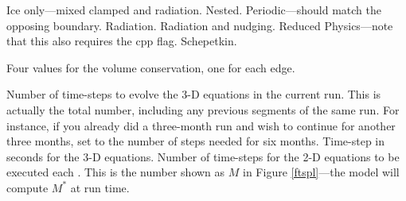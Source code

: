\begin{klist}
\begin{klist}
\begin{klist}
              Ice only---mixed clamped and radiation.
              Nested.
              Periodic---should match the opposing
boundary.
              Radiation.
           Radiation and nudging.
              Reduced Physics---note that this also
requires the  cpp flag.
              Schepetkin.
         \end{klist}
        Four values for the volume conservation, one
for each edge.
     \end{klist}
    \mbox{}
     \begin{klist}
           Number of time-steps to evolve the 3-D
       equations in the current run.  This is actually the total
     number, including any previous segments of the same run.  For
     instance, if you already did a three-month run and wish to
     continue for another three months, set  to the
     number of steps needed for six months.
               Time-step in seconds for the 3-D equations.
          Number of time-steps for the 2-D equations
     to be executed each . This is the number shown as $M$
     in Figure \ref{ftspl}---the model will compute $M^\ast$ at run
     time.
     \end{klist}
    \mbox{}


\end{klist}
